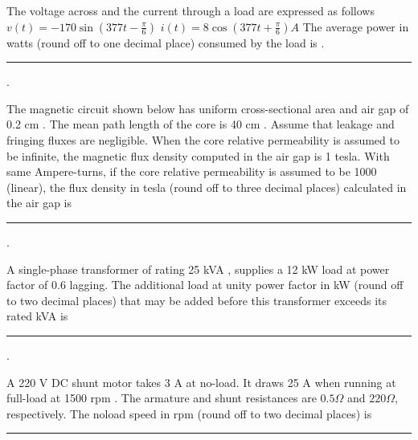 
\iffalse
\chapter{2019}
\author{Prajwal naik}
\section{ee}
\fi
    \item  The voltage across and the current through a load are expressed as follows
$v(t)=-170 \sin (377 t-\frac{\pi}{6}) $
$i(t)=8 \cos (377 t+\frac{\pi}{6}) {A}$
The average power in watts (round off to one decimal place) consumed by the load is
.\rule{1cm}{0.15mm}.
\hfill{}
 
  \item  The magnetic circuit shown below has uniform cross-sectional area and air gap of 0.2 cm . The mean path length of the core is 40 cm . Assume that leakage and fringing fluxes are negligible. When the core relative permeability is assumed to be infinite, the magnetic flux density computed in the air gap is 1 tesla. With same Ampere-turns, if the core relative permeability is assumed to be 1000 (linear), the flux density in tesla (round off to three decimal places) calculated in the air gap is \rule{1cm}{0.15mm}.
  
  \hfill{}

 
  
  \item  A single-phase transformer of rating 25 kVA , supplies a 12 kW load at power factor of 0.6 lagging. The additional load at unity power factor in kW (round off to two decimal places) that may be added before this transformer exceeds its rated kVA is \rule{1cm}{0.15mm}.
\hfill{}

\item A 220 V DC shunt motor takes 3 A at no-load. It draws 25 A when running at full-load at 1500 rpm . The armature and shunt resistances are $0.5 \Omega$ and $220 \Omega$, respectively. The noload speed in rpm (round off to two decimal places) is \rule{1cm}{0.15mm} 
    \hfill{}
    
